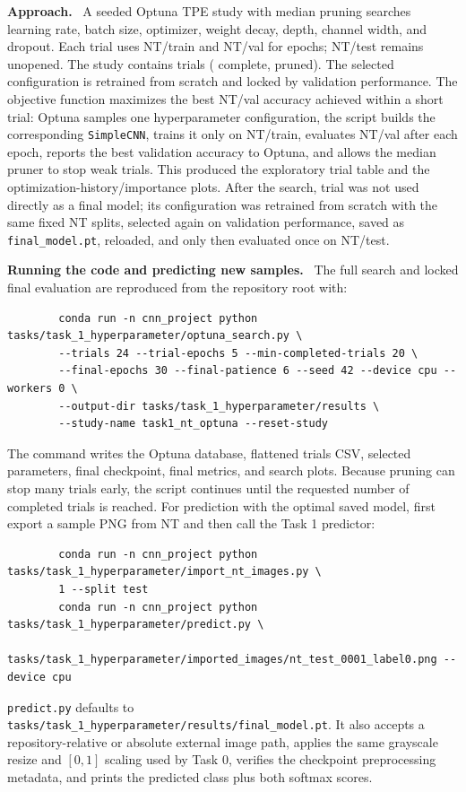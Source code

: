\documentclass[10pt,a4paper]{article}
\newcommand{\RunHead}[1]{\par\smallskip\noindent\textbf{#1.}\ }
\begin{document}
\RunHead{Approach}
A seeded Optuna TPE study with median pruning searches learning rate,
batch size, optimizer, weight decay, depth, channel width, and dropout. Each trial uses
NT/train and NT/val for \TaskOneTrialEpochs{} epochs; NT/test remains unopened. The study
contains \TaskOneTrials{} trials (\TaskOneComplete{} complete, \TaskOnePruned{} pruned).
The selected configuration is retrained from scratch and locked by validation performance.
The objective function maximizes the best NT/val accuracy achieved within a short trial:
Optuna samples one hyperparameter configuration, the script builds the corresponding
\texttt{SimpleCNN}, trains it only on NT/train, evaluates NT/val after each epoch, reports
the best validation accuracy to Optuna, and allows the median pruner to stop weak trials.
This produced the exploratory trial table and the optimization-history/importance plots.
After the search, trial \TaskOneBestTrial{} was not used directly as a final model; its
configuration was retrained from scratch with the same fixed NT splits, selected again on
validation performance, saved as \texttt{final\_model.pt}, reloaded, and only then evaluated
once on NT/test.

\RunHead{Running the code and predicting new samples}
The full search and locked final evaluation are reproduced from the repository root with:
\begin{small}
	\begin{verbatim}
		conda run -n cnn_project python tasks/task_1_hyperparameter/optuna_search.py \
		--trials 24 --trial-epochs 5 --min-completed-trials 20 \
		--final-epochs 30 --final-patience 6 --seed 42 --device cpu --workers 0 \
		--output-dir tasks/task_1_hyperparameter/results \
		--study-name task1_nt_optuna --reset-study
	\end{verbatim}
\end{small}
The command writes the Optuna database, flattened trials CSV, selected parameters, final
checkpoint, final metrics, and search plots. Because pruning can stop many trials early, the
script continues until the requested number of completed trials is reached. For prediction with
the optimal saved model, first export a sample PNG from NT and then call the Task 1 predictor:
\begin{small}
	\begin{verbatim}
		conda run -n cnn_project python tasks/task_1_hyperparameter/import_nt_images.py \
		1 --split test
		conda run -n cnn_project python tasks/task_1_hyperparameter/predict.py \
		tasks/task_1_hyperparameter/imported_images/nt_test_0001_label0.png --device cpu
	\end{verbatim}
\end{small}
\texttt{predict.py} defaults to \texttt{tasks/task\_1\_hyperparameter/results/final\_model.pt}.
It also accepts a repository-relative or absolute external image path, applies the same
grayscale resize and $[0,1]$ scaling used by Task 0, verifies the checkpoint preprocessing
metadata, and prints the predicted class plus both softmax scores.
\end{document}
